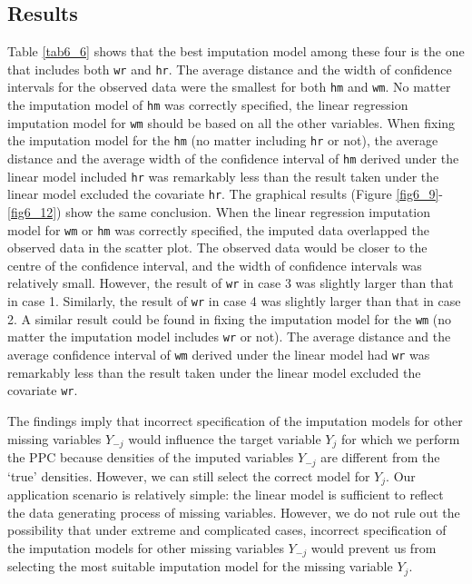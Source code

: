	\subsection{Results}
	Table \ref{tab6_6} shows that the best imputation model among these four is the one that includes both \texttt{wr} and \texttt{hr}. The average distance and the width of confidence intervals for the observed data were the smallest for both \texttt{hm} and \texttt{wm}. No matter the imputation model of \texttt{hm} was correctly specified, the linear regression imputation model for \texttt{wm} should be based on all the other variables. When fixing the imputation model for the \texttt{hm} (no matter including \texttt{hr} or not), the average distance and the average width of the confidence interval of \texttt{hm} derived under the linear model included \texttt{hr} was remarkably less than the result taken under the linear model excluded the covariate \texttt{hr}. The graphical results (Figure \ref{fig6_9}-\ref{fig6_12}) show the same conclusion. When the linear regression imputation model for \texttt{wm} or \texttt{hm} was correctly specified, the imputed data overlapped the observed data in the scatter plot. The observed data would be closer to the centre of the confidence interval, and the width of confidence intervals was relatively small. However, the result of \texttt{wr} in case 3 was slightly larger than that in case 1. Similarly, the result of \texttt{wr} in case 4 was slightly larger than that in case 2. A similar result could be found in fixing the imputation model for the \texttt{wm} (no matter the imputation model includes \texttt{wr} or not). The average distance and the average confidence interval of \texttt{wm} derived under the linear model had \texttt{wr} was remarkably less than the result taken under the linear model excluded the covariate \texttt{wr}.
	
	The findings imply that incorrect specification of the imputation models for other missing variables $Y_{-j}$ would influence the target variable $Y_j$ for which we perform the PPC because densities of the imputed variables $Y_{-j}$ are different from the `true' densities. However, we can still select the correct model for $Y_j$. Our application scenario is relatively simple: the linear model is sufficient to reflect the data generating process of missing variables. However, we do not rule out the possibility that under extreme and complicated cases, incorrect specification of the imputation models for other missing variables $Y_{-j}$ would prevent us from selecting the most suitable imputation model for the missing variable $Y_j$. 
	
